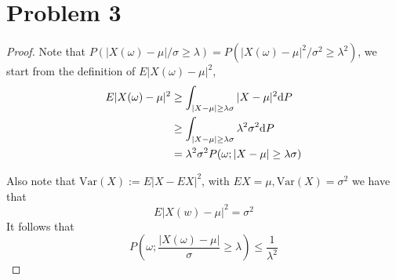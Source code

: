 \documentclass{homework}
\begin{document}
    \section{Problem 3}
    \begin{proof}
        Note that $P(|X(\omega)-\mu|/\sigma\geq\lambda)
        =P(|X(\omega)-\mu|^2/\sigma^2\geq\lambda^2)$,
        we start from the definition of $E|X(\omega)-\mu|^2$,
        \begin{align*}
            E|X(\omega)-\mu|^2
            &\geq\int_{|X-\mu|\geq\lambda\sigma}|X-\mu|^2\mathrm d P\\
            &\geq\int_{|X-\mu|\geq\lambda\sigma}\lambda^2\sigma^2\mathrm d P\\
            &=\lambda^2\sigma^2 P(\omega;|X-\mu|\geq \lambda\sigma)
        \end{align*}

        Also note that $\mathrm{Var}(X):=E|X-EX|^2$,
        with $EX=\mu,\mathrm{Var}(X)=\sigma^2$ we have that
        \[E|X(w)-\mu|^2=\sigma^2\]
        It follows that
        \[P\left(\omega;\frac{|X(\omega)-\mu|}{\sigma}\geq\lambda\right)
        \leq\frac{1}{\lambda^2}\]
    \end{proof}
\end{document}
